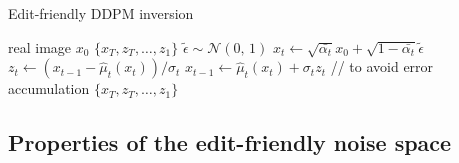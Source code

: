 \begin{algorithm}[tb]
   \caption{Edit-friendly DDPM inversion}
   \label{alg:example}
\begin{algorithmic}
    real image $x_0$ 
    $\{x_T,z_T,\ldots,z_1\}$
   \STATE $\tilde{\epsilon} \sim \mathcal{N}(0,\,1)$
   \STATE $x_t \leftarrow \sqrt{\bar{\alpha_t}} x_0 + \sqrt{1-\bar{\alpha_t}} \tilde{\epsilon}$
   \ENDFOR
   \STATE $z_t \leftarrow (x_{t-1} -\hat\mu_t(x_{t})) / \sigma_t $   
   \STATE $x_{t-1} \leftarrow \hat\mu_t(x_{t})+\sigma_t z_t$ \quad // to avoid error accumulation
   \ENDFOR
    $\{x_T,z_T,\ldots,z_1\}$
\end{algorithmic}
\end{algorithm}



\subsection{Properties of the edit-friendly noise space}
\label{sec:properties}

